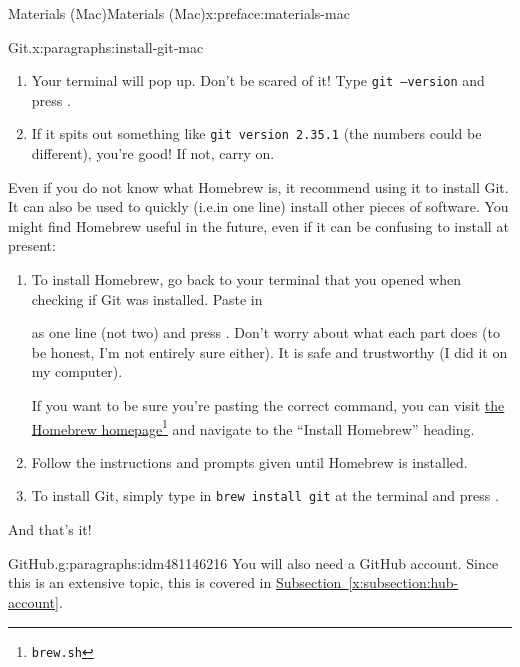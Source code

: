 \documentclass[oneside,10pt,]{book}
\newcommand{\xreffont}{\relax}
\newcommand{\mono}[1]{\texttt{#1}}
\newcommand{\kbd}[1]{\keys{{#1}}}
\begin{document}
\begin{preface}{Materials (Mac)}{}{Materials (Mac)}{}{}{x:preface:materials-mac}
\begin{paragraphs}{Git.}{x:paragraphs:install-git-mac}
\begin{enumerate}
\item{}Your terminal will pop up. Don't be scared of it! Type \mono{git --version} and press \kbd{Enter}.%
\item{}If it spits out something like \mono{git version 2.35.1} (the numbers could be different), you're good! If not, carry on.%
\end{enumerate}
%
\par
Even if you do not know what Homebrew is, it recommend using it to install Git. It can also be used to quickly (i.e.\@ in one line) install other pieces of software. You might find Homebrew useful in the future, even if it can be confusing to install at present:%
\begin{enumerate}
\item{}To install Homebrew, go back to your terminal that you opened when checking if Git was installed. Paste in%
as one line (not two) and press \kbd{Enter}. Don't worry about what each part does (to be honest, I'm not entirely sure either). It is safe and trustworthy (I did it on my computer).%
\par
If you want to be sure you're pasting the correct command, you can visit \href{https://brew.sh/}{the Homebrew homepage}\footnote{\nolinkurl{brew.sh}\label{g:fn:idm481159144}} and navigate to the ``Install Homebrew'' heading.%
\item{}Follow the instructions and prompts given until Homebrew is installed.%
\item{}To install Git, simply type in \mono{brew install git} at the terminal and press \kbd{Enter}.%
\end{enumerate}
And that's it!%
\end{paragraphs}%
\begin{paragraphs}{GitHub.}{g:paragraphs:idm481146216}%
You will also need a GitHub account. Since this is an extensive topic, this is covered in \hyperref[x:subsection:hub-account]{Subsection~{\xreffont\ref{x:subsection:hub-account}}}.%
\end{paragraphs}%
\end{preface}
%
%
\typeout{************************************************}
\typeout{************************************************}
%
\end{document}
